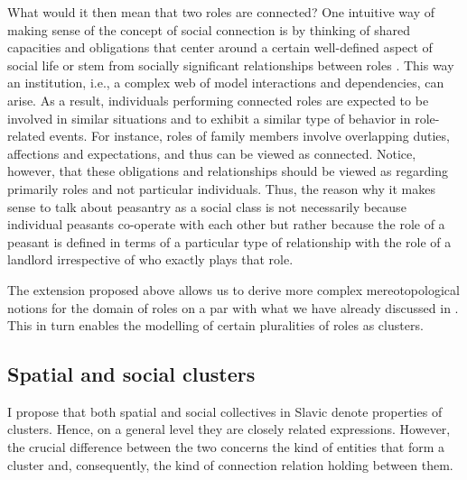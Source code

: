 \documentclass[output=paper]{langscibook}
\begin{document}
What would it then mean that two roles are connected? One intuitive way of making sense of the concept of social connection is by thinking of shared capacities and obligations that center around a certain well-defined aspect of social life or stem from socially significant relationships between roles \citep[see also][]{joosten2010collective}. This way an institution, i.e., a complex web of model interactions and dependencies, can arise. As a result, individuals performing connected roles are expected to be involved in similar situations and to exhibit a similar type of behavior in role-related events. For instance, roles of family members involve overlapping duties, affections and expectations, and thus can be viewed as connected. Notice, however, that these obligations and relationships should be viewed as regarding primarily roles and not particular individuals. Thus, the reason why it makes sense to talk about peasantry as a social class is not necessarily because individual peasants co-operate with each other but rather because the role of a peasant is defined in terms of a particular type of relationship with the role of a landlord irrespective of who exactly plays that role. 

The extension proposed above allows us to derive more complex mereotopological notions for the domain of roles on a par with what we have already discussed in . This in turn enables the modelling of certain pluralities of roles as clusters.

\subsection{Spatial and social clusters}\label{wan:sec:spatial-and-social-clusters}

I propose that both spatial and social collectives in Slavic denote properties of clusters. Hence, on a general level they are closely related expressions. However, the crucial difference between the two concerns the kind of entities that form a cluster and, consequently, the kind of connection relation holding between them.
\end{document}

